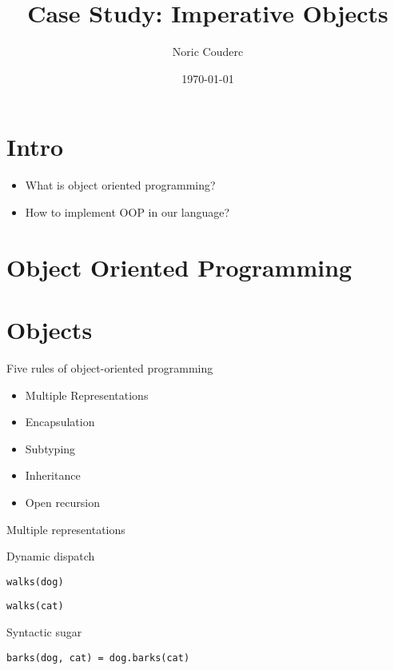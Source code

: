 \documentclass[presentation]{beamer}
\author{Noric Couderc}
\date{\today}
\title{Case Study: Imperative Objects}
\begin{document}
\maketitle

\section{Intro}
\begin{frame}
  \begin{itemize}
  \item What is object oriented programming?
  \item How to implement OOP in our language?
  \end{itemize}
\end{frame}

\section{Object Oriented Programming}

\section{Objects}
\begin{frame}{Five rules of object-oriented programming}
\begin{itemize}
\item Multiple Representations
\item Encapsulation
\item Subtyping
\item Inheritance
\item Open recursion
\end{itemize}
\end{frame}

\begin{frame}[fragile]{Multiple representations}
\begin{block}{Dynamic dispatch}
\begin{verbatim}
walks(dog)
\end{verbatim}
\begin{verbatim}
walks(cat)
\end{verbatim}
\end{block}

\begin{block}{Syntactic sugar}
\begin{verbatim}
barks(dog, cat) = dog.barks(cat)
\end{verbatim}
\end{block}
\end{frame}
\end{document}
